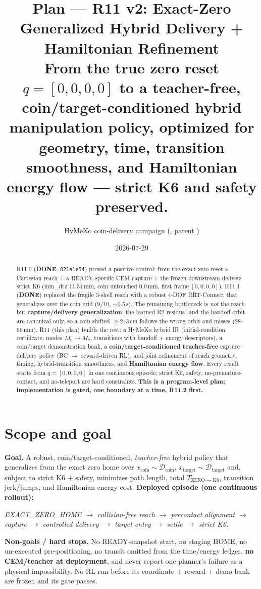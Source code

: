 \documentclass[11pt]{article}
\title{\textbf{Plan --- R11 v2: Exact-Zero Generalized Hybrid Delivery + Hamiltonian Refinement}\\[2pt]
\large From the true zero reset $q=[0,0,0,0]$ to a teacher-free, coin/target-conditioned hybrid manipulation policy,
optimized for geometry, time, transition smoothness, and Hamiltonian energy flow --- strict K6 and safety preserved.}
\author{HyMeKo coin-delivery campaign \quad(\code{recovery/coin-r9-causal-residual-delivery}, parent \code{021a1e54})}
\date{2026-07-29}
\newcommand{\code}[1]{\texttt{\small #1}}
\newcommand{\done}{\textcolor{green!50!black}{\textbf{DONE}}}
\begin{document}
\maketitle

\begin{abstract}
\noindent R11.0 (\done, \code{021a1e54}) proved a positive control: from the exact zero reset a Cartesian reach + a
READY-specific CEM capture + the frozen downstream delivers strict K6 (min\_dtz 11.54\,mm, coin untouched 0.0\,mm, first
frame $[0,0,0,0]$). R11.1 (\done) replaced the fragile 3-shell reach with a robust 4-DOF RRT-Connect that generalizes over
the coin grid (9/10, $\sim$0.5\,s). The remaining bottleneck is \emph{not} the reach but \textbf{capture/delivery
generalization}: the learned R2 residual and the handoff orbit are canonical-only, so a coin shifted $\geq$2--3\,cm follows
the wrong orbit and misses (28--66\,mm). R11 (this plan) builds the rest: a HyMeKo hybrid IR (initial-condition
certificate, modes $M_0\!\to\!M_7$, transitions with handoff + energy descriptors), a coin/target demonstration bank, a
\textbf{coin/target-conditioned teacher-free} capture--delivery policy (BC $\to$ reward-driven RL), and joint refinement of
reach geometry, timing, hybrid-transition smoothness, and \textbf{Hamiltonian energy flow}. Every result starts from
$q=[0,0,0,0]$ in one continuous episode; strict K6, safety, no-premature-contact, and no-teleport are hard constraints.
\textbf{This is a program-level plan; implementation is gated, one boundary at a time, R11.2 first.}
\end{abstract}

\section{Scope and goal}
\textbf{Goal.} A robust, coin/target-conditioned, \emph{teacher-free} hybrid policy that generalizes from the exact zero
home over $x_{\mathrm{coin}}\!\sim\!\mathcal D_{\mathrm{coin}}$, $x_{\mathrm{target}}\!\sim\!\mathcal D_{\mathrm{target}}$
and, subject to strict K6 + safety, minimizes path length, total $T_{\mathrm{ZERO}\to\mathrm{K6}}$, transition jerk/jumps,
and Hamiltonian energy cost. \textbf{Deployed episode (one continuous rollout):}
\begin{center}\itshape EXACT\_ZERO\_HOME $\to$ collision-free reach $\to$ precontact alignment $\to$ capture $\to$
controlled delivery $\to$ target entry $\to$ settle $\to$ strict K6.\end{center}
\textbf{Non-goals / hard stops.} No READY-snapshot start, no staging HOME, no un-executed pre-positioning, no
transit omitted from the time/energy ledger, \textbf{no CEM/teacher at deployment}, and never report one planner's failure
as a physical impossibility. No RL run before its coordinate + reward + demo bank are frozen and its gate passes.
\end{document}
